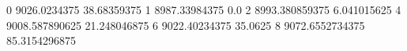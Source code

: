 0 9026.0234375 38.68359375
1 8987.33984375 0.0
2 8993.380859375 6.041015625
4 9008.587890625 21.248046875
6 9022.40234375 35.0625
8 9072.6552734375 85.3154296875

